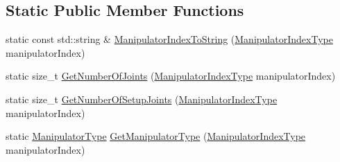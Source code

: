 \subsection*{Static Public Member Functions}
\begin{DoxyCompactItemize}
\item 
static const std\+::string \& \hyperlink{classmts_intuitive_da_vinci_aefc78edaad6191f59d720d0b1b344e89}{Manipulator\+Index\+To\+String} (\hyperlink{classmts_intuitive_da_vinci_a32a63e2057b2c00c8f08685f8f5736f4}{Manipulator\+Index\+Type} manipulator\+Index)
\item 
static size\+\_\+t \hyperlink{classmts_intuitive_da_vinci_a72124ccf78759573acc23db8729eb060}{Get\+Number\+Of\+Joints} (\hyperlink{classmts_intuitive_da_vinci_a32a63e2057b2c00c8f08685f8f5736f4}{Manipulator\+Index\+Type} manipulator\+Index)
\item 
static size\+\_\+t \hyperlink{classmts_intuitive_da_vinci_a4f8cc264ea95312f0592b5fc40caa4a8}{Get\+Number\+Of\+Setup\+Joints} (\hyperlink{classmts_intuitive_da_vinci_a32a63e2057b2c00c8f08685f8f5736f4}{Manipulator\+Index\+Type} manipulator\+Index)
\item 
static \hyperlink{classmts_intuitive_da_vinci_a7a5cc061071f2996eeb0bf812f8b1fb5}{Manipulator\+Type} \hyperlink{classmts_intuitive_da_vinci_aca5d3a34f4bf98b51716ce27c0cd2984}{Get\+Manipulator\+Type} (\hyperlink{classmts_intuitive_da_vinci_a32a63e2057b2c00c8f08685f8f5736f4}{Manipulator\+Index\+Type} manipulator\+Index)
\end{DoxyCompactItemize}
